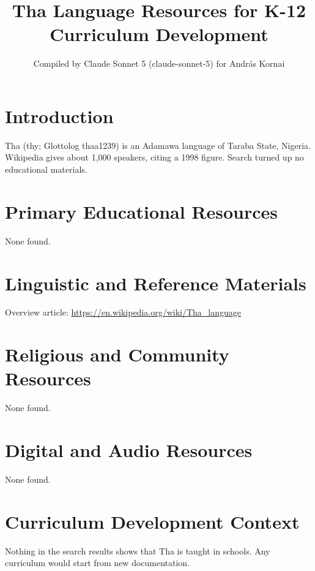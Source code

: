 \documentclass[12pt]{article}
\title{Tha Language Resources for K-12 Curriculum Development}
\author{Compiled by Claude Sonnet 5 (claude-sonnet-5) for Andr\'as Kornai}
\date{}
\begin{document}
\maketitle
\section{Introduction}
Tha (thy; Glottolog thaa1239) is an Adamawa language of Taraba State, Nigeria. Wikipedia gives about 1,000 speakers, citing a 1998 figure. Search turned up no educational materials.
\section{Primary Educational Resources}
None found.
\section{Linguistic and Reference Materials}
Overview article: \url{https://en.wikipedia.org/wiki/Tha_language}
\section{Religious and Community Resources}
None found.
\section{Digital and Audio Resources}
None found.
\section{Curriculum Development Context}
Nothing in the search results shows that Tha is taught in schools. Any curriculum would start from new documentation.
\end{document}
